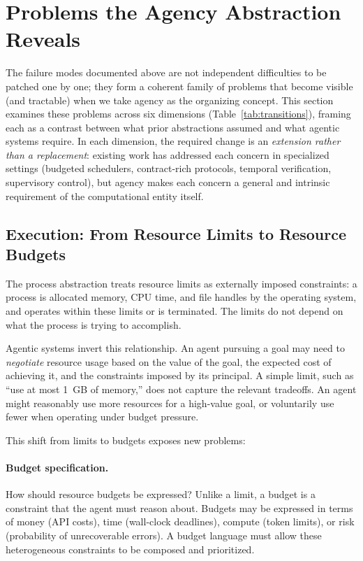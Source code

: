 \documentclass[11pt]{article}
\begin{document}
\section{Problems the Agency Abstraction Reveals}
\label{sec:reveals}

The failure modes documented above are not independent difficulties to be patched one by one; they form a coherent family of problems that become visible (and tractable) when we take agency as the organizing concept. This section examines these problems across six dimensions (Table~\ref{tab:transitions}), framing each as a contrast between what prior abstractions assumed and what agentic systems require. In each dimension, the required change is an \textit{extension rather than a replacement}: existing work has addressed each concern in specialized settings (budgeted schedulers, contract-rich protocols, temporal verification, supervisory control), but agency makes each concern a general and intrinsic requirement of the computational entity itself.

\subsection{Execution: From Resource Limits to Resource Budgets}

The process abstraction treats resource limits as externally imposed constraints: a process is allocated memory, CPU time, and file handles by the operating system, and operates within these limits or is terminated. The limits do not depend on what the process is trying to accomplish.

Agentic systems invert this relationship. An agent pursuing a goal may need to \textit{negotiate} resource usage based on the value of the goal, the expected cost of achieving it, and the constraints imposed by its principal. A simple limit, such as ``use at most 1~GB of memory,'' does not capture the relevant tradeoffs. An agent might reasonably use more resources for a high-value goal, or voluntarily use fewer when operating under budget pressure.

This shift from limits to budgets exposes new problems:

\paragraph{Budget specification.} How should resource budgets be expressed? Unlike a limit, a budget is a constraint that the agent must reason about. Budgets may be expressed in terms of money (API costs), time (wall-clock deadlines), compute (token limits), or risk (probability of unrecoverable errors). A budget language must allow these heterogeneous constraints to be composed and prioritized.
\end{document}
